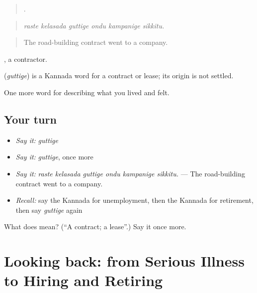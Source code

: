 \begin{quote}
     .
\end{quote}

\begin{quote}
\emph{raste kelasada guttige ondu kampanige sikkitu.}
\end{quote}

\begin{quote}
The road-building contract went to a company.
\end{quote}

, a contractor.

\begin{cousinweb}
\textbf{} (\emph{guttige}) is a Kannada word for a contract or lease; its origin is not settled.
\end{cousinweb}

\begin{grammarlens}[title={What you've built}]
One more word for describing what you lived and felt.
\end{grammarlens}

\subsection*{Your turn}
\begin{itemize}
\raggedright
  \item \emph{Say it:} \emph{guttige}
  \item \emph{Say it:} \emph{guttige}, once more
  \item \emph{Say it:} \emph{raste kelasada guttige ondu kampanige sikkitu.} — The road-building contract went to a company.
  \item \emph{Recall:} say the Kannada for unemployment, then the Kannada for retirement, then say \emph{guttige} again
\end{itemize}

\begin{tcolorbox}[breakable,colback=teal!4,colframe=teal!35!black,title={Before you move on}]
What does  mean? (\textquotedblleft{}A contract; a lease\textquotedblright{}.) Say it once more.
\end{tcolorbox}
\section[(dialogue)]{Looking back: from Serious Illness to Hiring and Retiring}

